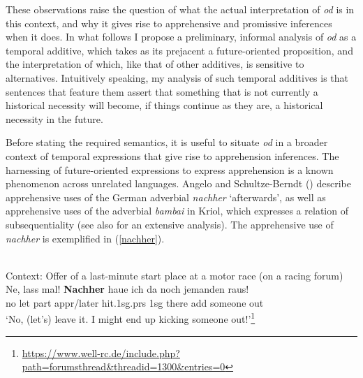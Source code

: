 \documentclass[output=paper,colorlinks,citecolor=brown]{langscibook}
\begin{document}
These observations raise the question of what the actual interpretation of \textit{od} is in this context, and why it gives rise to apprehensive and promissive inferences when it does. In  what follows I propose a preliminary, informal analysis of \textit{od} as a temporal additive, which takes as its prejacent a future-oriented proposition, and the interpretation of which, like that of other additives, is sensitive to alternatives. Intuitively speaking, my analysis of such temporal additives is that sentences that feature them assert that something that is not currently a historical necessity will become, if things continue as they are, a historical necessity in the future. 

Before stating the required semantics, it is useful to situate \textit{od} in a broader context of temporal expressions that give rise to apprehension inferences. The harnessing of future-oriented expressions to express apprehension is a known phenomenon across unrelated languages.
Angelo and Schultze-Berndt (\citeyear{angelo-berndt16, angelo-berndt18}) describe apprehensive uses of the German adverbial \textit{nachher} `afterwards', as well as apprehensive uses of the adverbial \textit{bambai} in Kriol, which expresses a relation of subsequentiality (see also \citealt{phillips18, phillips2021} for an extensive analysis). The apprehensive use of \textit{nachher} is exemplified in (\ref{nachher}).

\ea
\label{nachher}  \\
\textnormal{Context: Offer of a last-minute start place at a motor race (on a racing forum)} \\
\gll Ne, lass mal! \textbf{Nachher} haue ich da noch jemanden raus! \\
no let {\sc part} {\sc appr}/later hit.{\sc 1sg.prs} {\sc 1sg} there {\sc add} someone out \\

\glt `No, (let's) leave	it.	I might	end	up kicking someone out!'\footnote{\url{https://www.well-rc.de/include.php?path=forumsthread&threadid=1300&entries=0}}
\z
\end{document}
